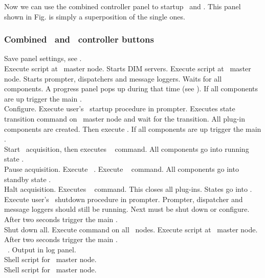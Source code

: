 Now we can use the combined  controller panel to startup \mbs\ and \dabc.
This panel shown in Fig.  is simply a superposition of the single ones.

\subsubsection[Combined DABC and MBS  controller buttons]{Combined \dabc\ and \mbs\  controller buttons}
 Save panel settings, see .\\
  Execute script  at \dabc\ master node.
Starts DIM servers.
Execute script  at \mbs\ master node.
Starts prompter, dispatchers and message loggers.
Waits for all components.
A progress panel pops up during that time
(see ).
If all components are up trigger the main .\\
 Configure. Execute user's \mbs\ startup procedure in prompter.
Executes state transition command 
on \dabc\ master node and wait for the transition.
All plug-in components are created. Then execute .
If all components are up trigger the main .\\
 Start \mbs\ acquisition, then executes \dabc\  command.
All components go into running state .\\
 Pause acquisition. Execute \mbs\ .
Execute \dabc\  command.
All components go into standby state .\\
 Halt acquisition. Executes \dabc\  command.
This closes all plug-ins. States go into . 
Execute user's \mbs\ shutdown procedure in prompter.
Prompter, dispatcher and message loggers should still be running.
Next must be shut down or configure.
After two seconds trigger the main .\\
 Shut down all. Execute  command on all \dabc\ nodes.
Execute script  at \mbs\ master node.
After two seconds trigger the main .\\
 \mbs\ . Output in log panel.\\
 Shell script for \mbs\ master node.\\
 Shell script for \dabc\ master node.


